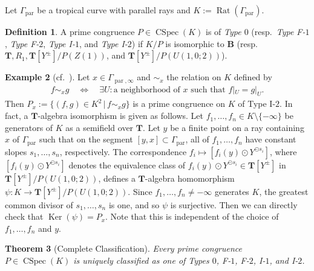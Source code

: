 \documentclass[a4paper,12pt]{amsart}
\theoremstyle{plain}
\newtheorem{theorem}{Theorem}[section]
\theoremstyle{definition}
\newtheorem{definition}[theorem]{Definition}
\newtheorem{example}[theorem]{Example}
\begin{document}
Let $\varGamma_{\operatorname{par}}$ be a tropical curve with parallel rays and $K := \operatorname{Rat}(\varGamma_{\operatorname{par}})$.

\begin{definition}
    \label{dfn3}
A prime congruence $P \in \operatorname{CSpec}(K)$ is of \textit{Type $0$} (resp.~\textit{Type F-$1$}, \textit{Type F-$2$}, \textit{Type I-$1$}, and \textit{Type I-$2$}) if $K/P$ is isomorphic to $\boldsymbol{B}$ (resp.~$\boldsymbol{T}, R_1, \boldsymbol{T}[Y^{\pm}]/P(Z(1))$, and $\boldsymbol{T}[Y^{\pm}]/P(U(1,0;2))$).
\end{definition}

\begin{example}[cf.~{\cite[Proposition~4.41]{JuAe7}}]
    \label{ex2}
Let $x \in \varGamma_{\operatorname{par}, \infty}$ and $\sim_x$ the relation on $K$ defined by
\begin{align*}
f \sim_x g \quad \Longleftrightarrow \quad \exists U : \text{a neighborhood of }x \text{ such that } f|_U = g|_U.
\end{align*}
Then $P_x := \{ (f, g) \in K^2 \,|\, f \sim_x g\}$ is a prime congruence on $K$ of Type I-$2$.
In fact, a $\boldsymbol{T}$-algebra isomorphism is given as follows.
Let $f_1, \ldots, f_n \in K \setminus \{ -\infty \}$ be generators of $K$ as a semifield over $\boldsymbol{T}$.
Let $y$ be a finite point on a ray containing $x$ of $\varGamma_{\operatorname{par}}$ such that on the segment $[y, x] \subset \varGamma_{\operatorname{par}}$, all of $f_1, \ldots, f_n$ have constant slopes $s_1, \ldots, s_n$, respectively.
The correspondence $f_i \mapsto [f_i(y) \odot Y^{\odot s_i}]$, where $[f_i(y) \odot Y^{\odot s_i}]$ denotes the equivalence class of $f_i(y) \odot Y^{\odot s_i} \in \boldsymbol{T}[Y^{\pm}]$ in $\boldsymbol{T}[Y^{\pm}] / P (U(1,0;2))$, defines a $\boldsymbol{T}$-algebra homomorphism $\psi : K \to \boldsymbol{T}[Y^{\pm}] / P (U(1,0;2))$.
Since $f_1, \ldots, f_n \not= -\infty$ generates $K$, the greatest common divisor of $s_1, \ldots, s_n$ is one, and so $\psi$ is surjective.
Then we can directly check that $\operatorname{Ker}(\psi) = P_x$.
Note that this is independent of the choice of $f_1, \ldots, f_n$ and $y$.
\end{example}

\begin{theorem}[Complete Classification]
    \label{thm4}
Every prime congruence $P \in \operatorname{CSpec}(K)$ is uniquely classified as one of Types $0$, F-$1$, F-$2$, I-$1$, and I-$2$.
\end{theorem}
\end{document}
